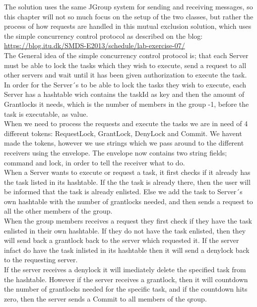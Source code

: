 The solution uses the same JGroup system for sending and receiving messages, so this chapter will not so much focus on the setup of the two classes, but rather the process of how requests are handled in this mutual exclusion solution, which uses the simple concurrency control protocol as described on the blog: \url{https://blog.itu.dk/SMDS-E2013/schedule/lab-exercise-07/} \\

The General idea of the simple concurrency control protocol is; that each Server must be able to lock the tasks which they wish to execute, send a request to all other servers and wait until it has been given authorization to execute the task. \\

In order for the Server´s to be able to lock the tasks they wish to execute, each Server has a hashtable wich contains the taskId as key and then the amount of Grantlocks it needs, which is the number of members in the group -1, before the task is executable, as value. \\

When we need to process the requests and execute the tasks we are in need of 4 different tokens: RequestLock, GrantLock, DenyLock and Commit. We havent made the tokens, however we use strings which we pass around to the different receivers using the envelope. The envelope now contains two string fields; command and lock, in order to tell the receiver what to do. \\

When a Server wants to execute or request a task, it first checks if it already has the task listed in its hashtable. If the the task is already there, then the user will be informed that the task is already enlisted. Else we add the task to Server´s own hashtable with the number of grantlocks needed, and then sends a request to all the other members of the group. \\

When the group members receives a request they first check if they have the task enlisted in their own hashtable. If they do not have the task enlisted, then they will send back a grantlock back to the server which requested it. If the server infact do have the task inlisted in its hashtable then it will send a denylock back to the requesting server. \\

If the server receives a denylock it will imediately delete the specified task from the hashtable. However if the server receives a grantlock, then it will countdown the number of grantlocks needed for the specific task, and if the countdown hits zero, then the server sends a Commit to all members of the qroup. \\

